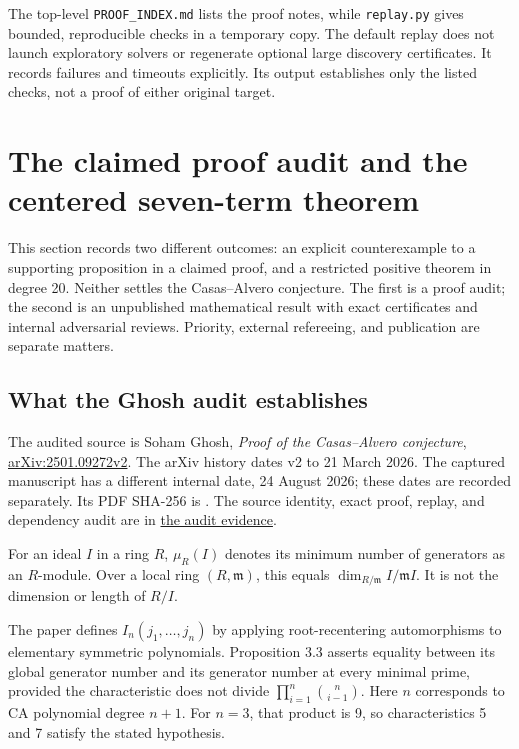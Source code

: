 \documentclass[
  british,
  10pt,
]{article}
\begin{document}
The top-level \texttt{PROOF\_INDEX.md} lists the proof notes, while
\texttt{replay.py} gives bounded, reproducible checks in a temporary
copy. The default replay does not launch exploratory solvers or
regenerate optional large discovery certificates. It records failures
and timeouts explicitly. Its output establishes only the listed checks,
not a proof of either original target.

\section{The claimed proof audit and the centered seven-term
theorem}\label{the-claimed-proof-audit-and-the-centered-seven-term-theorem}

This section records two different outcomes: an explicit counterexample
to a supporting proposition in a claimed proof, and a restricted
positive theorem in degree 20. Neither settles the Casas--Alvero
conjecture. The first is a proof audit; the second is an unpublished
mathematical result with exact certificates and internal adversarial
reviews. Priority, external refereeing, and publication are separate
matters.

\subsection{What the Ghosh audit
establishes}\label{what-the-ghosh-audit-establishes}

The audited source is Soham Ghosh, \emph{Proof of the Casas--Alvero
conjecture},
\href{https://arxiv.org/html/2501.09272v2}{arXiv:2501.09272v2}. The
arXiv history dates v2 to 21 March 2026. The captured manuscript has a
different internal date, 24 August 2026; these dates are recorded
separately. Its PDF SHA-256 is
.
The source identity, exact proof, replay, and dependency audit are in
\href{evidence/audit/README.md}{the audit evidence}.

For an ideal \(I\) in a ring \(R\), \(\mu_R(I)\) denotes its minimum
number of generators as an \(R\)-module. Over a local ring
\((R,\mathfrak m)\), this equals \(\dim_{R/\mathfrak m}I/\mathfrak mI\).
It is not the dimension or length of \(R/I\).

The paper defines \(I_n(j_1,\ldots,j_n)\) by applying root-recentering
automorphisms to elementary symmetric polynomials. Proposition 3.3
asserts equality between its global generator number and its generator
number at every minimal prime, provided the characteristic does not
divide \(\prod_{i=1}^n\binom n{i-1}\). Here \(n\) corresponds to CA
polynomial degree \(n+1\). For \(n=3\), that product is 9, so
characteristics 5 and 7 satisfy the stated hypothesis.
\end{document}

